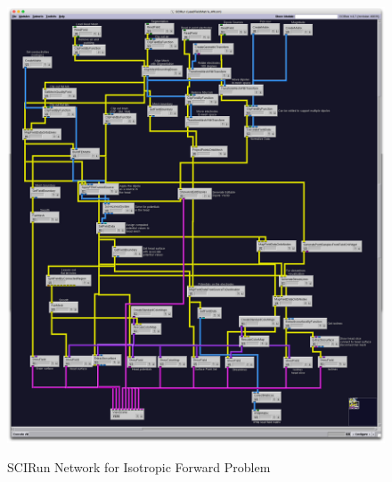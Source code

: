 \begin{figure}[p]
\begin{center}
\includegraphics[width=\textwidth]{Figures/iso_network.png}\\
\caption{SCIRun Network for Isotropic Forward Problem}
\label{fig:isofornet}
\end{center}
\end{figure}

